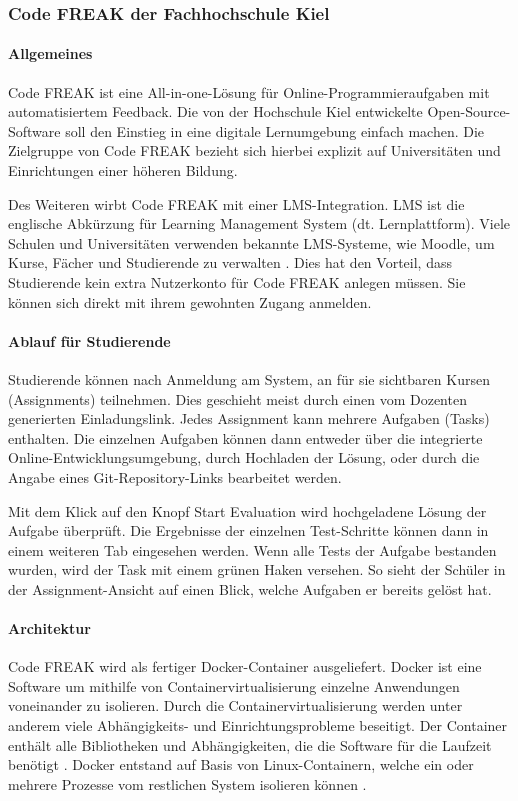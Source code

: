 \newpage
\subsubsection{Code FREAK der Fachhochschule Kiel}
\paragraph{Allgemeines}
Code FREAK ist eine All-in-one-Lösung für Online-Programmieraufgaben mit
automatisiertem Feedback. Die von der Hochschule Kiel entwickelte
Open-Source-Software soll den Einstieg in eine digitale Lernumgebung einfach
machen. Die Zielgruppe von Code FREAK bezieht sich hierbei explizit auf
Universitäten und Einrichtungen einer höheren Bildung.
\cite{codefreak-startseite}

Des Weiteren wirbt Code FREAK mit einer LMS-Integration. LMS ist die englische
Abkürzung für Learning Management System (dt. Lernplattform). Viele Schulen und
Universitäten verwenden bekannte LMS-Systeme, wie Moodle, um Kurse, Fächer und
Studierende zu verwalten \cite{moodle}.
Dies hat den Vorteil, dass Studierende kein extra Nutzerkonto für Code FREAK
anlegen müssen. Sie können sich direkt mit ihrem gewohnten Zugang anmelden.

\paragraph{Ablauf für Studierende}
Studierende können nach Anmeldung am System, an für sie sichtbaren Kursen
(Assignments) teilnehmen. Dies geschieht meist durch einen vom Dozenten
generierten Einladungslink. Jedes Assignment kann mehrere Aufgaben (Tasks)
enthalten. Die einzelnen Aufgaben können dann entweder über die integrierte
Online-Entwicklungsumgebung, durch Hochladen der Lösung, oder durch die Angabe
eines Git-Repository-Links bearbeitet werden.

Mit dem Klick auf den Knopf \glqq Start Evaluation\grqq{} wird hochgeladene
Lösung der Aufgabe überprüft. Die Ergebnisse der einzelnen Test-Schritte können
dann in einem weiteren Tab eingesehen werden. Wenn alle Tests der Aufgabe
bestanden wurden, wird der Task mit einem grünen Haken versehen. So sieht der
Schüler in der Assignment-Ansicht auf einen Blick, welche Aufgaben er bereits
gelöst hat.

\paragraph{Architektur}
Code FREAK wird als fertiger Docker-Container ausgeliefert. Docker ist eine
Software um mithilfe von Containervirtualisierung einzelne Anwendungen
voneinander zu isolieren. Durch die Containervirtualisierung werden unter
anderem viele Abhängigkeits- und Einrichtungsprobleme beseitigt. Der Container
enthält alle Bibliotheken und Abhängigkeiten, die die Software für die Laufzeit
benötigt \cite{docker}. Docker entstand auf Basis von Linux-Containern, welche
ein oder mehrere Prozesse vom restlichen System isolieren können 
\cite{linux-container}.


